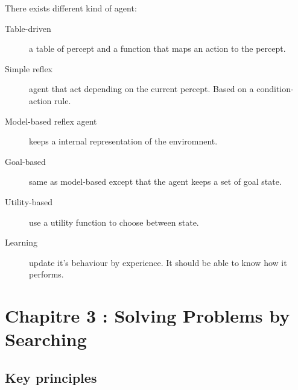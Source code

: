 There exists different kind of agent:
\begin{description}
\item[Table-driven] a table of percept and a function that maps an action to the percept.
\item[Simple reflex] agent that act depending on the current percept. Based on a condition-action 
rule.
\item[Model-based reflex agent] keeps a internal representation of the enviromnent.
\item[Goal-based] same as model-based except that the agent keeps a set of goal state.
\item[Utility-based] use a utility function to choose between state.
\item[Learning] update it's behaviour by experience. It should be able to know how it performs. 
\end{description}
\section{Chapitre 3 : Solving Problems by Searching}

\subsection{Key principles}

